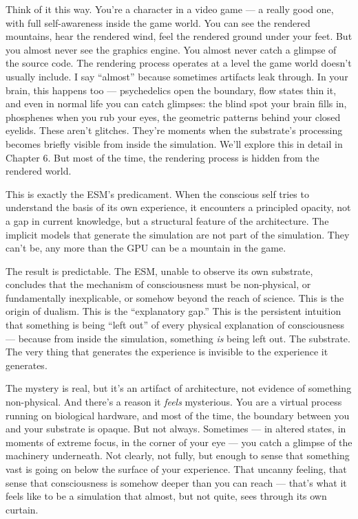 \documentclass[11pt, twoside, openright]{book}
\begin{document}
Think of it this way. You're a character in a video game --- a really good one, with full self-awareness inside the game world. You can see the rendered mountains, hear the rendered wind, feel the rendered ground under your feet. But you almost never see the graphics engine. You almost never catch a glimpse of the source code. The rendering process operates at a level the game world doesn't usually include. I say ``almost'' because sometimes artifacts leak through. In your brain, this happens too --- psychedelics open the boundary, flow states thin it, and even in normal life you can catch glimpses: the blind spot your brain fills in, phosphenes when you rub your eyes, the geometric patterns behind your closed eyelids. These aren't glitches. They're moments when the substrate's processing becomes briefly visible from inside the simulation. We'll explore this in detail in Chapter 6. But most of the time, the rendering process is hidden from the rendered world.

This is exactly the ESM's predicament. When the conscious self tries to understand the basis of its own experience, it encounters a principled opacity, not a gap in current knowledge, but a structural feature of the architecture. The implicit models that generate the simulation are not part of the simulation. They can't be, any more than the GPU can be a mountain in the game.

The result is predictable. The ESM, unable to observe its own substrate, concludes that the mechanism of consciousness must be non-physical, or fundamentally inexplicable, or somehow beyond the reach of science. This is the origin of dualism. This is the ``explanatory gap.'' This is the persistent intuition that something is being ``left out'' of every physical explanation of consciousness --- because from inside the simulation, something \textit{is} being left out. The substrate. The very thing that generates the experience is invisible to the experience it generates.

The mystery is real, but it's an artifact of architecture, not evidence of something non-physical. And there's a reason it \textit{feels} mysterious. You are a virtual process running on biological hardware, and most of the time, the boundary between you and your substrate is opaque. But not always. Sometimes --- in altered states, in moments of extreme focus, in the corner of your eye --- you catch a glimpse of the machinery underneath. Not clearly, not fully, but enough to sense that something vast is going on below the surface of your experience. That uncanny feeling, that sense that consciousness is somehow deeper than you can reach --- that's what it feels like to be a simulation that almost, but not quite, sees through its own curtain.
\end{document}
